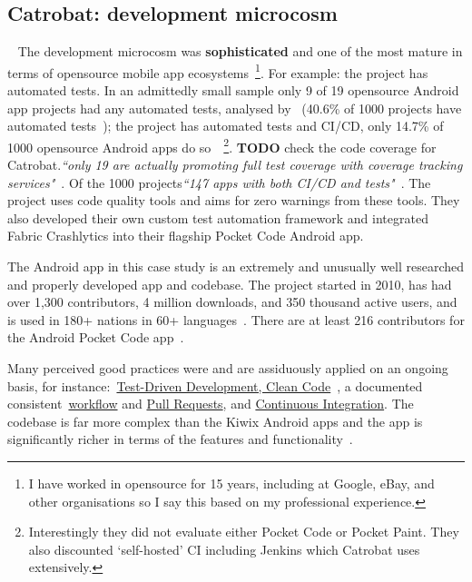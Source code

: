 \subsection{Catrobat: development microcosm}~\label{catrobat-development-microcosm}
The development microcosm was \textbf{sophisticated} and one of the most mature in terms of opensource mobile app ecosystems~\footnote{I have worked in opensource for 15 years, including at Google, eBay, and other organisations so I say this based on my professional experience.}. For example: the project has automated tests. In an admittedly small sample only 9 of 19 opensource Android app projects had any automated tests, analysed by~ (40.6\% of 1000 projects have automated tests~); the project has automated tests and CI/CD, only 14.7\% of 1000 opensource Android apps do so~~\footnote{Interestingly they did not evaluate either Pocket Code or Pocket Paint. They also discounted `self-hosted' CI including Jenkins which Catrobat uses extensively.}.  \textbf{TODO} check the code coverage for Catrobat.\emph{``only 19 are actually promoting full test coverage with coverage tracking services"}~. Of the 1000 projects\emph{``147 apps with both CI/CD and tests"}~. The project uses code quality tools and aims for zero warnings from these tools. They also developed their own custom test automation framework and integrated Fabric Crashlytics into their flagship Pocket Code Android app.


The Android app in this case study is an extremely and unusually well researched and properly developed app and codebase. The project started in 2010, has had over 1,300 contributors, 4 million downloads, and 350 thousand active users, and is used in 180+ nations in 60+ languages~. There are at least 216 contributors for the Android Pocket Code app~.

Many perceived good practices were and are assiduously applied on an ongoing basis, for instance:~\href{https://github.com/Catrobat/Catroid}{Test-Driven Development, Clean Code}~, a documented consistent~\href{https://github.com/Catrobat/Catroid/wiki/Workflow}{workflow} and \href{https://github.com/Catrobat/Catroid/wiki/Creating-a-pull-request}{Pull Requests}, and \href{https://jenkins.catrob.at/job/Catroid/}{Continuous Integration}. The codebase is far more complex than the Kiwix Android apps and the app is significantly richer in terms of the features and functionality~.

